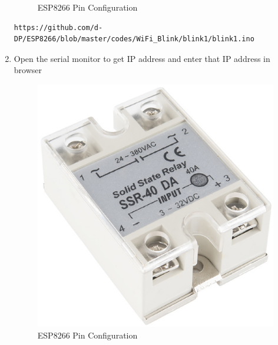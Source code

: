 \documentclass[journal,12pt,twocolumn]{IEEEtran}
\begin{document}
\begin{enumerate}
\begin{figure}[!h]
\caption{ESP8266 Pin Configuration}
\label{fig:ESP8266}
\end{figure}
\begin{lstlisting}
https://github.com/d-DP/ESP8266/blob/master/codes/WiFi_Blink/blink1/blink1.ino
\end{lstlisting}
\item Open the serial monitor to get IP address and enter that IP address in browser
\begin{figure}[!h]
\centering
\includegraphics[width=\columnwidth]{./figs/relay.eps}
\caption{ESP8266 Pin Configuration}
\label{fig:ESP8266}
\end{figure}

\end{enumerate}
\end{document}
